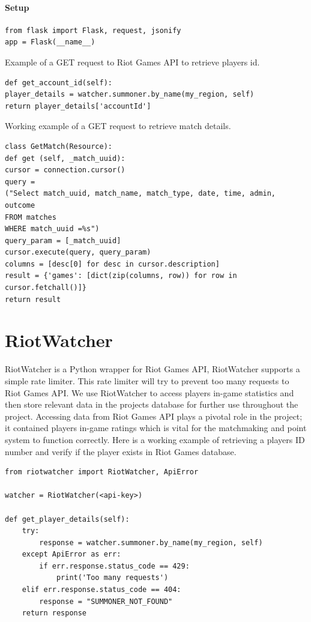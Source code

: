 \paragraph{Setup}
\begin{verbatim}
from flask import Flask, request, jsonify
app = Flask(__name__)
\end{verbatim}

Example of a GET request to Riot Games API to retrieve players id.
\begin{verbatim}
def get_account_id(self):
player_details = watcher.summoner.by_name(my_region, self)
return player_details['accountId']
\end{verbatim}

Working example of a GET request to retrieve match details.
\begin{verbatim}
class GetMatch(Resource):
def get (self, _match_uuid):
cursor = connection.cursor()
query = 
("Select match_uuid, match_name, match_type, date, time, admin, outcome 
FROM matches 
WHERE match_uuid =%s")
query_param = [_match_uuid]
cursor.execute(query, query_param)
columns = [desc[0] for desc in cursor.description]
result = {'games': [dict(zip(columns, row)) for row in cursor.fetchall()]}
return result
\end{verbatim}

\newpage
\section{RiotWatcher}
RiotWatcher is a Python wrapper for Riot Games API, RiotWatcher supports a simple rate limiter. This rate limiter \cite{dealcisco} will try to prevent too many requests to Riot Games API. We use RiotWatcher to access players in-game statistics and then store relevant data in the projects database for further use throughout the project. 
Accessing data from Riot Games API plays a pivotal role in the project; it contained players in-game ratings which is vital for the matchmaking and point system to function correctly. Here is a working example of retrieving a players ID number and verify if the player exists in Riot Games database.
\begin{verbatim}
from riotwatcher import RiotWatcher, ApiError

watcher = RiotWatcher(<api-key>)

def get_player_details(self):
	try:
		response = watcher.summoner.by_name(my_region, self)
	except ApiError as err:
		if err.response.status_code == 429:
			print('Too many requests')
	elif err.response.status_code == 404:
		response = "SUMMONER_NOT_FOUND"
	return response
\end{verbatim}
\newpage
